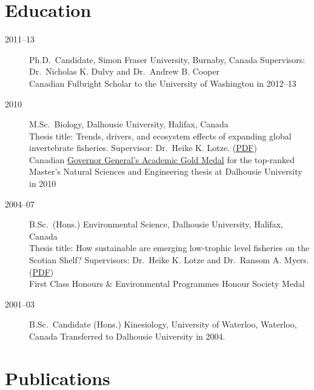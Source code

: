 \section{Education}

\begin{description}
\item[2011--13]
Ph.D.\ Candidate, Simon Fraser University, Burnaby, Canada Supervisors:
Dr.\ Nicholas K. Dulvy and Dr.\ Andrew B. Cooper\\Canadian Fulbright
Scholar to the University of Washington in 2012--13
\item[2010]
M.Sc.\ Biology, Dalhousie University, Halifax, Canada\\Thesis title:
Trends, drivers, and ecosystem effects of expanding global invertebrate
fisheries. Supervisor: Dr.\ Heike K. Lotze.
(\href{papers/Anderson_MSc_2010.pdf}{PDF})\\Canadian
\href{http://goo.gl/nA1zE}{Governor General's Academic Gold Medal} for
the top-ranked Master's Natural Sciences and Engineering thesis at
Dalhousie University in 2010
\item[2004--07]
B.Sc.\ (Hons.) Environmental Science, Dalhousie University, Halifax,
Canada\\Thesis title: How sustainable are emerging low-trophic level
fisheries on the Scotian Shelf? Supervisors: Dr.\ Heike K. Lotze and
Dr.\ Ransom A. Myers. (\href{papers/Anderson_HSc_2006.pdf}{PDF})\\First
Class Honours \& Environmental Programmes Honour Society Medal
\item[2001--03]
B.Sc.\ Candidate (Hons.) Kinesiology, University of Waterloo, Waterloo,
Canada Transferred to Dalhousie University in 2004.
\end{description}

\section{Publications}

